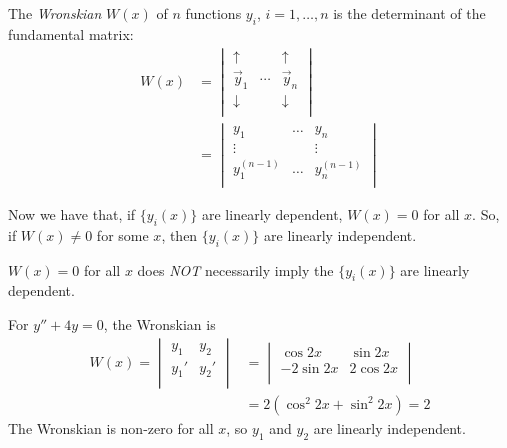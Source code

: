 \documentclass{../template/note}
\begin{document}
    \begin{definition}
        The \emph{Wronskian} \(W(x)\) of \(n\) functions \(y_i\), \(i = 1, \dots, n\) is the determinant of the fundamental matrix:
        \begin{align*}
            W(x) &= \begin{vmatrix}
              \uparrow &  & \uparrow \\
              \vec y_1 & \cdots & \vec y_n \\
              \downarrow &  & \downarrow \\
            \end{vmatrix} \\
            &= \begin{vmatrix}
             y_1 & \dots & y_n \\
             \vdots &  & \vdots \\
             y_1^{(n-1)} & \dots & y_n^{(n-1)} \\
            \end{vmatrix}
        \end{align*}
    \end{definition}
    
    Now we have that, if \(\{y_i(x)\}\) are linearly dependent, \(W(x) = 0\) for all \(x\). So, if \(W(x) \neq 0\) for some \(x\), then \(\{y_i(x)\}\) are linearly independent.

    \begin{remark*}
        \(W(x) = 0\) for all \(x\) does \emph{NOT} necessarily imply the \(\{y_i(x)\}\) are linearly dependent.
    \end{remark*}
    
    \begin{example}
        For \(y'' + 4y = 0\), the Wronskian is
        \begin{align*}
            W(x) = \begin{vmatrix}
             y_1 & y_2 \\
             y_1' & y_2' \\
            \end{vmatrix} &= \begin{vmatrix}
             \cos 2x & \sin 2x \\
             -2 \sin 2x & 2 \cos 2x \\
            \end{vmatrix} \\
            &= 2(\cos^2 2x + \sin^2 2x) = 2
        \end{align*}
        The Wronskian is non-zero for all \(x\), so \(y_1\) and \(y_2\) are linearly independent.
    \end{example}
\end{document}
